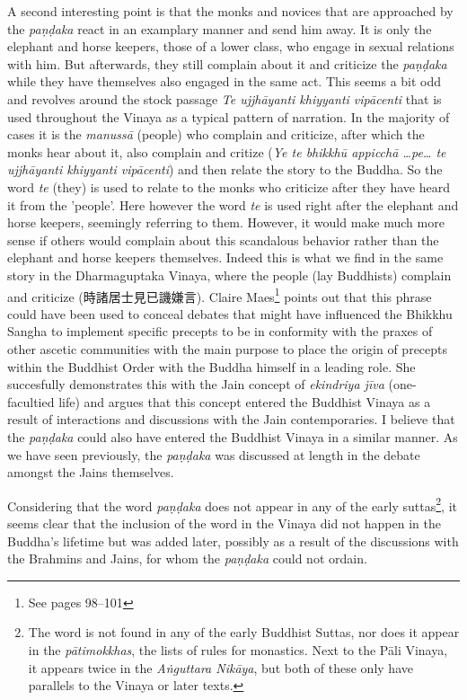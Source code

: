 A second interesting point is that the monks and novices that are approached by the {\em paṇḍaka} react in an examplary manner and send him away. It is only the elephant and horse keepers, those of a lower class, who engage in sexual relations with him. But afterwards, they still complain about it and criticize the {\em paṇḍaka} while they have themselves also engaged in the same act. This seems a bit odd and revolves around the stock passage {\em Te ujjhāyanti khiyyanti vipācenti} that is used throughout the Vinaya as a typical pattern of narration. In the majority of cases it is the {\em manussā} (people) who complain and criticize, after which the monks hear about it, also complain and critize ({\em Ye te bhikkhū appicchā …pe… te ujjhāyanti khiyyanti vipācenti}) and then relate the story to the Buddha. So the word {\em te} (they) is used to relate to the monks who criticize after they have heard it from the 'people'. Here however the word {\em te} is used right after the elephant and horse keepers, seemingly referring to them. However, it would make much more sense if others would complain about this scandalous behavior rather than the elephant and horse keepers themselves. Indeed this is what we find in the same story in the Dharmaguptaka Vinaya, where the people (lay Buddhists) complain and criticize (時諸居士見已譏嫌言). Claire Maes\footnote{See \cite{maes2011} pages 98–101} points out that this phrase could have been used to conceal debates that might have influenced the Bhikkhu Sangha to implement specific precepts to be in conformity with the praxes of other ascetic communities with the main purpose to place the origin of precepts within the Buddhist Order with the Buddha himself in a leading role. She succesfully demonstrates this with the Jain concept of {\em ekindriya jīva} (one-facultied life) and argues that this concept entered the Buddhist Vinaya as a result of interactions and discussions with the Jain contemporaries. I believe that the {\em paṇḍaka} could also have entered the Buddhist Vinaya in a similar manner. As we have seen previously, the {\em paṇḍaka} was discussed at length in the debate amongst the Jains themselves.

Considering that the word {\em paṇḍaka} does not appear in any of the early suttas\footnote{The word is not found in any of the early Buddhist Suttas, nor does it appear in the {\em pātimokkhas}, the lists of rules for monastics. Next to the Pāli Vinaya, it appears twice in the {\em Aṅguttara Nikāya}, but both of these only have parallels to the Vinaya or later texts.}, it seems clear that the inclusion of the word in the Vinaya did not happen in the Buddha's lifetime but was added later, possibly as a result of the discussions with the Brahmins and Jains, for whom the {\em paṇḍaka} could not ordain.

